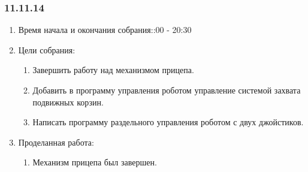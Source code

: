 
\subsubsection{11.11.14}

\begin{enumerate} 
	\item Время начала и окончания собрания::00 - 20:30
	\item Цели собрания:\newline
	\begin{enumerate}
		\item Завершить работу над механизмом прицепа.\newline
		
		\item Добавить в программу управления роботом управление системой захвата подвижных корзин.\newline
		
		\item Написать программу раздельного управления роботом с двух джойстиков.\newline
		
	\end{enumerate}
	
	\item Проделанная работа:\newline
	\begin{enumerate}
		\item Механизм прицепа был завершен.\newline
		

\end{enumerate}
\end{enumerate}
